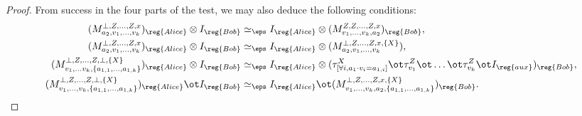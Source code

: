 \begin{proof}
    
    From success in the four parts of the test, we may also deduce the
    following conditions:
    \begin{align*}
      (M^{\bot, Z, \dots ,Z, x}_{a_2, v_1, \dots, v_k})_{\reg{Alice}} \otimes I_{\reg{Bob}} &\simeq_{\eps}
                                       I_{\reg{Alice}} \otimes (M^{Z,Z, \dots, Z, x}_{v_1,
                             \dots, v_k, 
                                a_2})_{\reg{Bob}}, \\
      (M^{\bot, Z,\dots, Z, x}_{a_2, v_1, \dots, v_k})_{\reg{Alice}} \otimes I_{\reg{Bob}} &\simeq_{\eps} 
 	                     I_{\reg{Alice}} \otimes (M^{\bot,Z ,\dots, Z,  x, \{X\}}_{a_2, v_1,
                             \dots, v_k}), \\
      (M^{\bot, Z,\dots, Z,  \bot, \{X\}}_{v_1, \dots v_k, \{a_{1,1}, \dots,
                                                                    a_{1, k}\}})_{\reg{Alice}} \otimes I_{\reg{Bob}} &\simeq_{\eps}
      			I_{\reg{Alice}} \otimes (\tau^X_{[\forall i, a_1 \cdot v_i = a_{1, i}]} \ot \tau^{Z}_{v_1} \ot \dots \ot \tau^{Z}_{v_k} \ot
                                                                                                                       I_{\reg{aux}})_{\reg{Bob}}, \\
      (M^{\bot, Z, \dots, Z, \bot, \{X\}}_{v_1, \dots, v_k, \{a_{1,1},
      \dots, a_{1,k}\}})_{\reg{Alice}} \ot I_{\reg{Bob}}
                                                                                            &\simeq_{\eps}
                                                                                              I_{\reg{Alice}}
                                                                                              \ot
                                                                                              (M^{\bot,
                                                                                              Z,
                                                                                              \dots,
                                                                                              Z,
                                                                                              x,
                                                                                              \{X\}}_{v_1,
                                                                                              \dots,
                                                                                              v_k, a_2,
                                                                                              \{a_{1,1},
                                                                                              \dots,
                                                                                              a_{1,k}\}} )_{\reg{Bob}}.
    \end{align*}
    

\end{proof}

